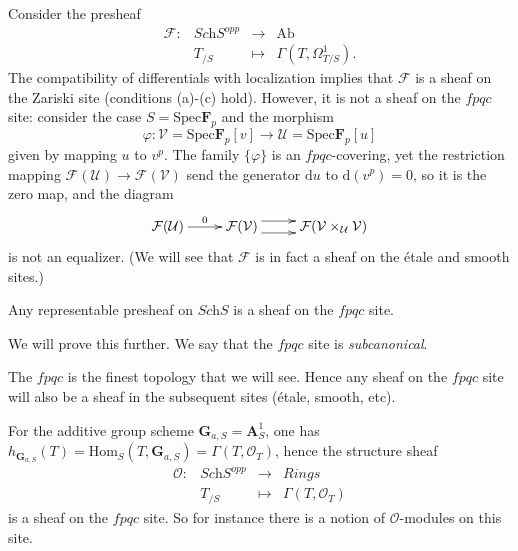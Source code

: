 \begin{example}
Consider the presheaf 
$$
\begin{array}{rccl}
\mathcal{F} : & \textit{Sch}S^{opp} & \to & \text{Ab} \\
& T_{/S} & \mapsto & \Gamma(T, \Omega^1_{T/S}).
\end{array}
$$
The compatibility of differentials with localization implies that $\mathcal{F}$ 
is a sheaf on the Zariski site (conditions (a)-(c) hold). However, it is not a 
sheaf on the $fpqc$ site: consider the case $S = \text{Spec} \mathbf{F}_p$ and 
the morphism 
$$
\varphi: \mathcal{V} = \text{Spec} \mathbf{F}_p[v] \to \mathcal{U} = 
\text{Spec} \mathbf{F}_p[u]
$$
given by mapping $u$ to $v^p$. The family $\{\varphi \}$ is an $fpqc$-covering, 
yet the restriction mapping $\mathcal{F}(\mathcal{U}) \to 
\mathcal{F}(\mathcal{V})$ send the generator $\mathrm{d} u$ to $\mathrm{d}(v^p) 
= 0$, so it is the zero map, and the diagram
$$
\xymatrix{
\mathcal{F}(\mathcal{U}) \ar[r]^{0} &
\mathcal{F}(\mathcal{V}) \ar@<1ex>[r] \ar@<-1ex>[r] &
\mathcal{F}(\mathcal{V} \times_\mathcal{U} \mathcal{V})
}
$$
is not an equalizer. (We will see that $\mathcal{F}$ is in fact a sheaf on the 
\'etale and smooth sites.)
\end{example}

\begin{lemma}
Any representable presheaf on $\textit{Sch}S$ is a sheaf on the $fpqc$ site.
\end{lemma}

\noindent
We will prove this further. We say that the $fpqc$ site is \emph{subcanonical}.

\begin{remark}
The $fpqc$ is the finest topology that we will see. Hence any sheaf on the 
$fpqc$ site will also be a sheaf in the subsequent sites (\'etale, smooth, etc).
\end{remark}

\begin{example}
For the additive group scheme $\mathbf{G}_{a,S} = \mathbf{A}^1_S$, one has 
$h_{\mathbf{G}_{a,S}} (T) = \text{Hom}_S (T,\mathbf{G}_{a,S}) = 
\Gamma(T,\mathcal{O}_T)$, hence the structure sheaf
$$
\begin{array}{rccl}
\mathcal{O} : & \textit{Sch}S^{opp} & \to & \textit{Rings} \\
& T_{/S} & \mapsto & \Gamma(T, \mathcal{O}_{T})
\end{array}
$$
is a sheaf on the $fpqc$ site. So for instance there is a notion of 
$\mathcal{O}$-modules on this site.
\end{example}

